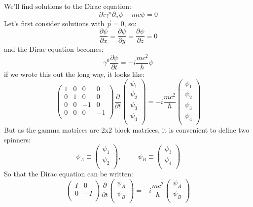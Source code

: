 \documentclass[12pt]{book}
\begin{document}
We'll find solutions to the Dirac equation:
$$i\hbar \gamma^u \partial_u \psi -mc \psi = 0$$
Let's first consider solutions with $\vec{p}=0$, so:
$$\frac{\partial\psi}{\partial x} = \frac{\partial\psi}{\partial y} = \frac{\partial\psi}{\partial z} = 0$$
and the Dirac equation becomes:
$$\gamma^0 \frac{\partial \psi}{\partial t} = -i \frac{mc^2}{\hbar} \psi $$
if we wrote this out the long way, it looks like:
$$
\begin{pmatrix} 
1 & 0 & 0 & 0\\
0 & 1 & 0 & 0\\
0 & 0 &-1 & 0\\
0 & 0 & 0 &-1\\
\end{pmatrix}
\frac{\partial}{\partial t}
\begin{pmatrix} 
\psi_1\\
\psi_2\\
\psi_3\\
\psi_4\\
\end{pmatrix}
=
-i \frac{mc^2}{\hbar}
\begin{pmatrix} 
\psi_1\\
\psi_2\\
\psi_3\\
\psi_4\\
\end{pmatrix}
$$
But as the gamma matrices are 2x2 block matrices, it is convenient to define two spinners:
$$\psi_A \equiv \begin{pmatrix} \psi_1\\ \psi_2\\ \end{pmatrix}, \hspace{1cm}
\psi_B \equiv \begin{pmatrix} \psi_3\\ \psi_4\\ \end{pmatrix}
$$
So that the Dirac equation can be written:
$$
\begin{pmatrix} 
I &  0\\
0 & -I\\
\end{pmatrix}
\frac{\partial}{\partial t}
\begin{pmatrix} 
\psi_A\\
\psi_B\\
\end{pmatrix}
=
-i \frac{mc^2}{\hbar}
\begin{pmatrix} 
\psi_A\\
\psi_B\\
\end{pmatrix}
$$
\end{document}
